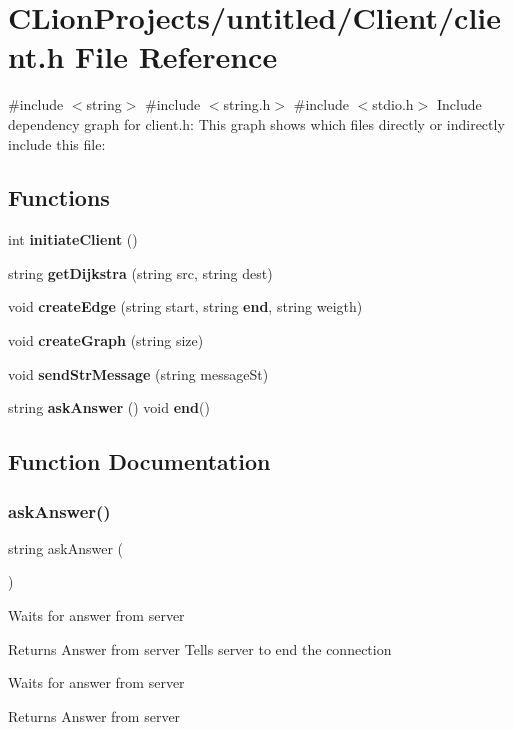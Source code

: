 \section{C\+Lion\+Projects/untitled/\+Client/client.h File Reference}
\label{client_8h}
{\ttfamily \#include $<$string$>$}\newline
{\ttfamily \#include $<$string.\+h$>$}\newline
{\ttfamily \#include $<$stdio.\+h$>$}\newline
Include dependency graph for client.\+h\+:
This graph shows which files directly or indirectly include this file\+:
\subsection*{Functions}
\begin{DoxyCompactItemize}
\item 
int \textbf{ initiate\+Client} ()
\item 
string \textbf{ get\+Dijkstra} (string src, string dest)
\item 
void \textbf{ create\+Edge} (string start, string \textbf{ end}, string weigth)
\item 
void \textbf{ create\+Graph} (string size)
\item 
void \textbf{ send\+Str\+Message} (string message\+St)
\item 
string \textbf{ ask\+Answer} () void \textbf{ end}()
\end{DoxyCompactItemize}


\subsection{Function Documentation}
\mbox{\label{client_8h_a0853315fb5e55e739f44b607af8e2bd3}} 
\subsubsection{ask\+Answer()}
{\footnotesize\ttfamily string ask\+Answer (\begin{DoxyParamCaption}{ }\end{DoxyParamCaption})}

Waits for answer from server \begin{DoxyReturn}{Returns}
Answer from server Tells server to end the connection
\end{DoxyReturn}
Waits for answer from server \begin{DoxyReturn}{Returns}
Answer from server 
\end{DoxyReturn}
\mbox{\label{client_8h_a84311d819f2a8eadbaca4b5dfb5a40f7}} 
